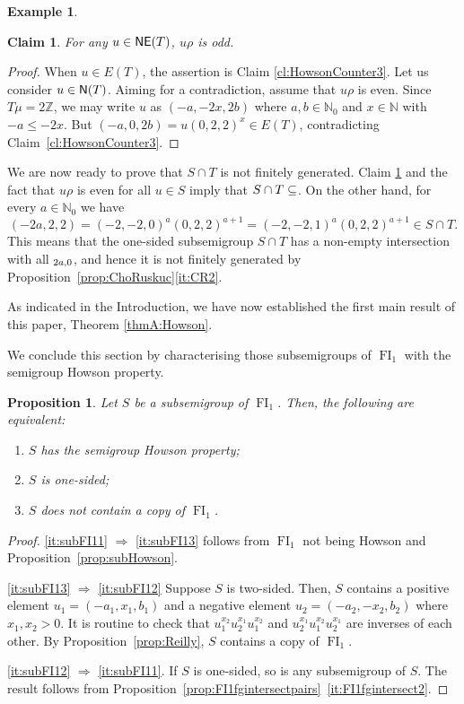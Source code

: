 \documentclass[reqno]{amsart}
\theoremstyle{plain}
\newtheorem{claim}{Claim}[lem]
\newtheorem{prop}[lem]{Proposition}
\theoremstyle{definition}
\newtheorem{ex}[lem]{Example}
\DeclareMathOperator{\FI}{FI}
\let\P\relax
\DeclareMathOperator{\P}{\textup{\textsf{P}}}
\DeclareMathOperator{\N}{\textup{\textsf{N}}}
\DeclareMathOperator{\NE}{\textup{\textsf{NE}}}
\newenvironment{thmenumerate}{\begin{enumerate}[topsep=0mm, leftmargin=14mm,itemsep=1mm,label=\textup{(\roman*)}]
}{\end{enumerate}}
\numberwithin{equation}{section}
\begin{document}
\begin{ex}
\begin{claim}
\label{cl:HowsonCounter4}
For any $u\in\NE(T)$, $u\rho$ is odd.
\end{claim}


\begin{proof}
When $u\in E(T)$, the assertion is Claim \ref{cl:HowsonCounter3}.
Let us consider $u\in \N(T)$.
Aiming for a contradiction, assume
that $u\rho$ is even. Since $T\mu = 2\mathbb{Z}$, we may write $u$ as $(-a, -2x, 2b)$ where $a,b\in\mathbb{N}_0$ and $x\in\mathbb{N}$ with $-a\leq -2x$. But $(-a, 0, 2b) = u(0, 2, 2)^x\in E(T)$, contradicting Claim~\ref{cl:HowsonCounter3}. 
\end{proof}

We are now ready to prove that $S\cap T$ is not finitely generated.
Claim \ref{cl:HowsonCounter4} and the fact that $u\rho$ is even for all $u\in S$ imply that
$S\cap T\subseteq \P$.
On the other hand, for every $a\in \mathbb{N}_0$ we have 
\[
(-2a,2,2)=(-2,-2,0)^a (0,2,2)^{a+1}=(-2, -2, 1)^a(0, 2, 2)^{a+1}\in S\cap T.
\]
This means that the one-sided subsemigroup $S\cap T$ has a non-empty intersection with all $\P_{2a, 0}$,
and hence it is not finitely generated by Proposition~\ref{prop:ChoRuskuc}\ref{it:CR2}.
\end{ex}


As indicated in the Introduction, we have now established the first main result of this paper, Theorem \ref{thmA:Howson}.

We conclude this section by characterising those subsemigroups of $\FI_1$ with the semigroup Howson property.

\begin{prop}
\label{prop:subFI1iff}
Let $S$ be a subsemigroup of $\FI_1$. Then, the following are equivalent:
\begin{thmenumerate}
    \item \label{it:subFI11} $S$ has the semigroup Howson property;
    \item \label{it:subFI12} $S$ is one-sided;
    \item \label{it:subFI13} $S$ does not contain a copy of $\FI_1$.
\end{thmenumerate}
\end{prop}
\begin{proof}
\ref{it:subFI11} $\Rightarrow$ \ref{it:subFI13} follows from $\FI_1$ not being Howson and Proposition~\ref{prop:subHowson}. 

\noindent \ref{it:subFI13} $\Rightarrow$ \ref{it:subFI12} Suppose $S$ is two-sided. Then, $S$ contains a positive element $u_1 = (-a_1, x_1, b_1)$ and a negative element $u_2 = (-a_2, -x_2, b_2)$ where $x_1, x_2>0$. It is routine to check that $u_1^{x_2}u_2^{x_1}u_1^{x_2}$ and $u_2^{x_1}u_1^{x_2}u_2^{x_1}$ are inverses of each other. By Proposition~\ref{prop:Reilly}, $S$ contains a copy of $\FI_1$.

\noindent\ref{it:subFI12} $\Rightarrow$ \ref{it:subFI11}. If $S$ is one-sided, so is any subsemigroup of $S$. The result follows from Proposition~\ref{prop:FI1fgintersectpairs}~\ref{it:FI1fgintersect2}.
\end{proof}
\end{document}
